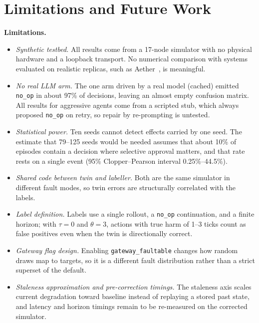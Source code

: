 \documentclass[conference]{IEEEtran}
\begin{document}
\section{Limitations and Future Work}
\label{sec:limits}

\textbf{Limitations.}
\begin{itemize}
  \item \emph{Synthetic testbed.} All results come from a 17-node simulator with no physical hardware and a loopback transport. No numerical comparison with systems evaluated on realistic replicas, such as Aether~\cite{aether}, is meaningful.
  \item \emph{No real LLM arm.} The one arm driven by a real model (cached) emitted \texttt{no\_op} in about 97\% of decisions, leaving an almost empty confusion matrix. All results for aggressive agents come from a scripted stub, which always proposed \texttt{no\_op} on retry, so repair by re-prompting is untested.
  \item \emph{Statistical power.} Ten seeds cannot detect effects carried by one seed. The estimate that 79--125 seeds would be needed assumes that about 10\% of episodes contain a decision where selective approval matters, and that rate rests on a single event (95\% Clopper--Pearson interval 0.25\%--44.5\%).
  \item \emph{Shared code between twin and labeller.} Both are the same simulator in different fault modes, so twin errors are structurally correlated with the labels.
  \item \emph{Label definition.} Labels use a single rollout, a \texttt{no\_op} continuation, and a finite horizon; with $\tau = 0$ and $\theta = 3$, actions with true harm of 1--3 ticks count as false positives even when the twin is directionally correct.
  \item \emph{Gateway flag design.} Enabling \texttt{gateway\_faultable} changes how random draws map to targets, so it is a different fault distribution rather than a strict superset of the default.
  \item \emph{Staleness approximation and pre-correction timings.} The staleness axis scales current degradation toward baseline instead of replaying a stored past state, and latency and horizon timings remain to be re-measured on the corrected simulator.
\end{itemize}
\end{document}
